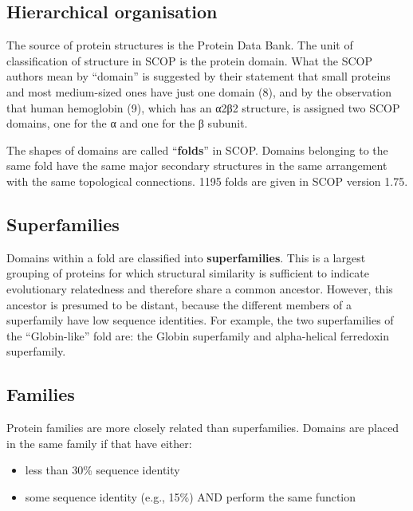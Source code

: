 \documentclass[
]{book}
\providecommand{\tightlist}{%
  \setlength{\itemsep}{0pt}\setlength{\parskip}{0pt}}
\begin{document}
\hypertarget{hierarchical-organisation}{%
\subsection{Hierarchical organisation}\label{hierarchical-organisation}}

The source of protein structures is the Protein Data Bank. The unit of classification of structure in SCOP is the protein domain. What the SCOP authors mean by ``domain'' is suggested by their statement that small proteins and most medium-sized ones have just one domain (8), and by the observation that human hemoglobin (9), which has an α2β2 structure, is assigned two SCOP domains, one for the α and one for the β subunit.

The shapes of domains are called ``\textbf{folds}'' in SCOP. Domains belonging to the same fold have the same major secondary structures in the same arrangement with the same topological connections. 1195 folds are given in SCOP version 1.75.

\hypertarget{superfamilies}{%
\subsection{Superfamilies}\label{superfamilies}}

Domains within a fold are classified into \textbf{superfamilies}. This is a largest grouping of proteins for which structural similarity is sufficient to indicate evolutionary relatedness and therefore share a common ancestor. However, this ancestor is presumed to be distant, because the different members of a superfamily have low sequence identities. For example, the two superfamilies of the ``Globin-like'' fold are: the Globin superfamily and alpha-helical ferredoxin superfamily.

\hypertarget{families}{%
\subsection{Families}\label{families}}

Protein families are more closely related than superfamilies. Domains are placed in the same family if that have either:

\begin{itemize}
\tightlist
\item
  less than 30\% sequence identity
\item
  some sequence identity (e.g., 15\%) AND perform the same function
\end{itemize}
\end{document}
